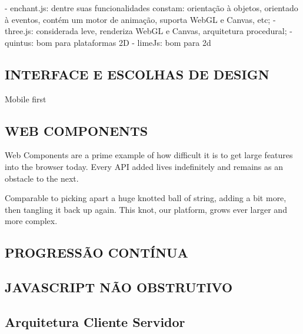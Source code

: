 \documentclass[11pt,a4paper]{article}
\begin{document}
- enchant.js: dentre suas funcionalidades constam: orientação à objetos, orientado à eventos, contém um motor de animação, suporta WebGL e Canvas, etc;
- three.js: considerada leve, renderiza WebGL e Canvas, arquitetura procedural;
- quintus: bom para plataformas 2D
- limeJs: bom para 2d

\subsection{ INTERFACE E ESCOLHAS DE DESIGN}
Mobile first


\subsection{WEB COMPONENTS}

Web Components are a prime example of how difficult it is to get large features into the browser today. Every API added lives indefinitely and remains as an obstacle to the next.

Comparable to picking apart a huge knotted ball of string, adding a bit more, then tangling it back up again. This knot, our platform, grows ever larger and more complex.

\subsection{PROGRESSÃO CONTÍNUA}

\subsection{JAVASCRIPT NÃO OBSTRUTIVO}

\subsection{Arquitetura Cliente Servidor}
\end{document}
